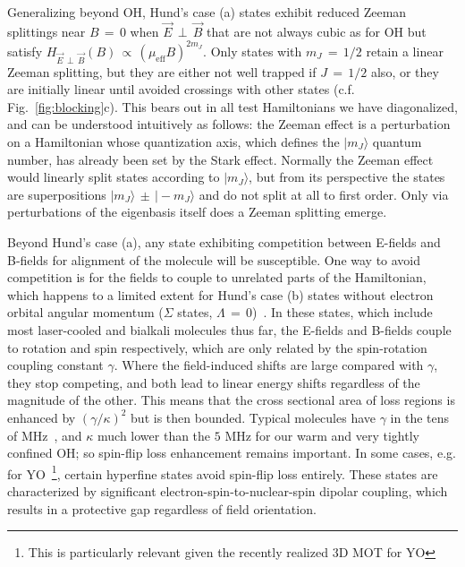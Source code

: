 \documentclass[%
 reprint,
 amsmath,amssymb,
 aps,
prl,
]{revtex4-1}
\newcommand{\epb}{{$\vec{E}\,{\perp}\,\vec{B}$}}
\newcommand{\epbm}{{\vec{E}\,{\perp}\,\vec{B}}}
\begin{document}
Generalizing beyond OH, Hund's case (a) states exhibit reduced Zeeman splittings near $B\,{=}\,0$ when \epb{} that are not always cubic as for OH but satisfy $H_\epbm(B)\,{\propto}\,(\mu_\text{eff}B)^{2m_J}$. 
Only states with $m_J\,{=}\,1/2$ retain a linear Zeeman splitting, but they are either not well trapped if $J\,{=}\,1/2$ also, or they are initially linear until avoided crossings with other states (c.f. Fig.~\ref{fig:blocking}c). 
This bears out in all test Hamiltonians we have diagonalized, and can be understood intuitively as follows: the Zeeman effect is a perturbation on a Hamiltonian whose quantization axis, which defines the $|m_J\rangle$ quantum number, has already been set by the Stark effect. 
Normally the Zeeman effect would linearly split states according to $|m_J\rangle$, but from its perspective the states are superpositions $|m_J\rangle\,{\pm}\,|\!-\!m_J\rangle$ and do not split at all to first order. 
Only via perturbations of the eigenbasis itself does a Zeeman splitting emerge.

Beyond Hund's case (a), any state exhibiting competition between E-fields and B-fields for alignment of the molecule will be susceptible. 
One way to avoid competition is for the fields to couple to unrelated parts of the Hamiltonian, which happens to a limited extent for Hund's case (b) states without electron orbital angular momentum ($\Sigma$ states, $\Lambda\,{=}\,0$)~\cite{Bohn2013}. 
In these states, which include most laser-cooled and bialkali molecules thus far, the E-fields and B-fields couple to rotation and spin respectively, which are only related by the spin-rotation coupling constant $\gamma$. 
Where the field-induced shifts are large compared with $\gamma$, they stop competing, and both lead to linear energy shifts regardless of the magnitude of the other. 
This means that the cross sectional area of loss regions is enhanced by $(\gamma/\kappa)^2$ but is then bounded. 
Typical molecules have $\gamma$ in the tens of MHz~\cite{Quemener2016}, and $\kappa$ much lower than the $5\text{ MHz}$ for our warm and very tightly confined OH; so spin-flip loss enhancement remains important. 
In some cases, e.g. for YO~\footnote{This is particularly relevant given the recently realized 3D MOT for YO}, certain hyperfine states avoid spin-flip loss entirely. 
These states are characterized by significant electron-spin-to-nuclear-spin dipolar coupling, which results in a protective gap regardless of field orientation.


\end{document}

